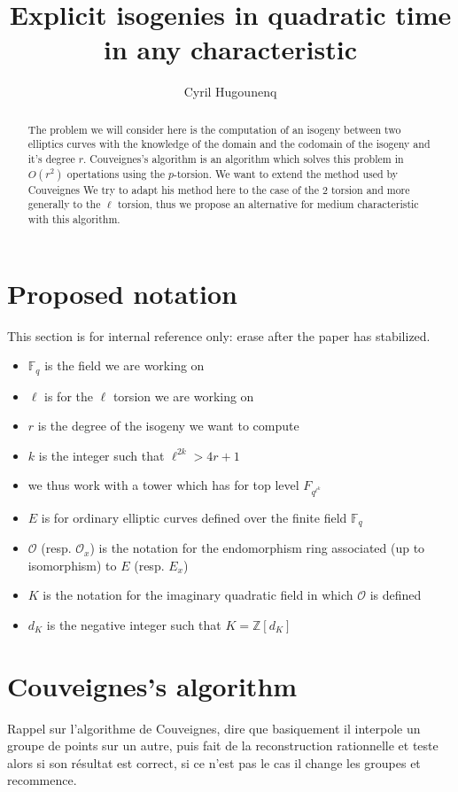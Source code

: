 \documentclass{article}
\title{Explicit isogenies in quadratic time in any characteristic}
\author{Cyril Hugounenq}
\theoremstyle{plain}
\theoremstyle{definition}
\theoremstyle{remark}
\begin{document}
\begin{abstract}
The problem we will consider here is the computation of an isogeny between two elliptics curves with the knowledge of the domain and the codomain of the isogeny and it's degree $r$. Couveignes's algorithm is an algorithm which solves this problem in $O(r^2)$ opertations using the $p$-torsion. We want to extend the method used by Couveignes  We try to adapt his method here to the case of the $2$ torsion and more generally to the $\ell$ torsion, thus we propose an alternative for medium characteristic with this algorithm.
\end{abstract}

\section*{Proposed notation}

This section is for internal reference only: erase after the paper has
stabilized.

\begin{itemize}
\item $\mathbb{F}_q$ is the field we are working on
\item $\ell$ is for the $\ell$ torsion we are working on
\item $r$ is the degree of the isogeny we want to compute
\item $k$ is the integer such that $\ell^{2k}>4r+1$
\item we thus work with a tower which has for top level $F_{q^{\ell^k}}$
\item $E$ is for ordinary elliptic curves defined over the finite field $\mathbb{F}_q$
\item $\mathcal{O}$ (resp. $\mathcal{O}_x$) is the notation for the endomorphism ring associated (up to isomorphism) to $E$ (resp. $E_x$)
\item $K$ is the notation for the imaginary quadratic field in which $\mathcal{O}$ is defined
\item $d_K$ is the negative integer such that $K=\mathbb{Z}[d_K]$  
\end{itemize}
\section{Couveignes's algorithm}
Rappel sur l'algorithme de Couveignes, dire que basiquement il interpole un groupe de points sur un autre, puis fait de la reconstruction rationnelle et teste alors si son résultat est correct, si ce n'est pas le cas il change les groupes et recommence. 
\end{document}
